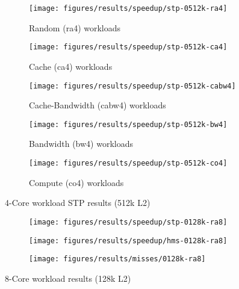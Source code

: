 \begin{figure}
    \centering
    \begin{subfigure}[b]{\textwidth}
            \texttt{[image: figures/results/speedup/stp-0512k-ra4]}
            \caption{Random (ra4) workloads}
            \label{fig:results:4core:stp:random}
    \end{subfigure}

    \begin{subfigure}[b]{0.5\textwidth}
            \texttt{[image: figures/results/speedup/stp-0512k-ca4]}
            \caption{Cache (ca4) workloads}
            \label{fig:results:4core:stp:cache}
    \end{subfigure}%
    \begin{subfigure}[b]{0.5\textwidth}
            \texttt{[image: figures/results/speedup/stp-0512k-cabw4]}
            \caption{Cache-Bandwidth (cabw4) workloads}
            \label{fig:results:4core:stp:cache-bw}
    \end{subfigure}

    \begin{subfigure}[b]{0.5\textwidth}
            \texttt{[image: figures/results/speedup/stp-0512k-bw4]}
            \caption{Bandwidth (bw4) workloads}
            \label{fig:results:4core:stp:bw}
    \end{subfigure}%
    \begin{subfigure}[b]{0.5\textwidth}
            \texttt{[image: figures/results/speedup/stp-0512k-co4]}
            \caption{Compute (co4) workloads}
            \label{fig:results:4core:stp:co}
    \end{subfigure}%

    \caption{4-Core workload STP results (512k L2)}\label{fig:results:4core:stp}
\end{figure}



\begin{figure}
    \centering
    \begin{subfigure}[b]{\textwidth}
            \texttt{[image: figures/results/speedup/stp-0128k-ra8]}
            \label{fig:results:4core:hms:random}
    \end{subfigure}

    \begin{subfigure}[b]{\textwidth}
            \texttt{[image: figures/results/speedup/hms-0128k-ra8]}
            \label{fig:results:4core:hms:cache}
    \end{subfigure}
    \begin{subfigure}[b]{\textwidth}
            \texttt{[image: figures/results/misses/0128k-ra8]}
            \label{fig:results:4core:hms:cache-bw}
    \end{subfigure}

    \caption{8-Core workload results (128k L2)}\label{fig:results:4core:hms}
\end{figure}

